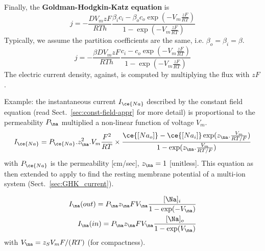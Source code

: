 Finally, the {\bf Goldman-Hodgkin-Katz equation} is
\begin{equation}
  \label{eq:1241}
  j = -\frac{DV_mzF}{RTh} \frac{\beta_ic_i-\beta_o c_o\exp(-V_m\frac{zF}{RT})}{1-\exp(-V_m\frac{zF}{RT})}
\end{equation}
Typically, we assume the partition coefficients are the same,
i.e. $\beta_o =\beta_i = \beta$.
\begin{equation}
  \label{eq:1245}
  j = -\frac{\beta DV_mzF}{RTh} \frac{c_i- c_o\exp(-V_m\frac{zF}{RT})}{1-\exp(-V_m\frac{zF}{RT})}
\end{equation}
The electric current density, against, is computed by multiplying the
flux with $zF$.

Example: the instantaneous current $I_{\ce{Na}}$ described by the constant field
equation (read Sect.~\ref{sec:const-field-appr} for more detail) is proportional
to the permeability $P_\na$ multiplied a non-linear function of voltage $V_m$.
\begin{equation}
  \label{eq:876}
    I_{\ce{Na}} =
  P_{\ce{Na}}.z_\na^2.V_m\frac{F^2}{RT}\times\frac{\ce{[Na_o]}-\ce{[Na_i]}\exp(z_\na.\frac{V_m}{RT/F})}{1-\exp(z_\na.\frac{V_m}{RT/F})}
\end{equation}
with $P_{\ce{Na}}$ is the permeability [cm/sec], $z_\na=1$ [unitless].  This
equation as then extended  to apply to find the resting membrane potential of a
multi-ion system (Sect.~\ref{sec:GHK_current}).

\begin{equation}
\begin{split}
I_\na(out) = P_\na z_\na F V_\na \frac{[\Na]_i}{1-\exp(-V_\na)} \\
I_\na(in) = P_\na z_\na F V_\na \frac{[\Na]_o}{1-\exp(V_\na)} \\
\end{split}
\end{equation}
with $V_\na = z_S V_m F/(RT)$ (for compactness).

